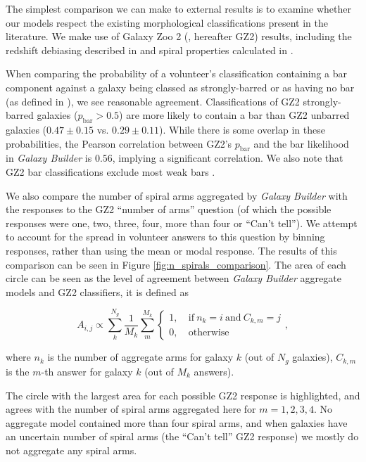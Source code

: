 \documentclass[trackchanges]{aastex63}
\begin{document}
The simplest comparison we can make to external results is to examine whether our models respect the existing morphological classifications present in the literature. We make use of Galaxy Zoo 2 (\citealt{Willett2013:1308.3496v2}, hereafter GZ2) results, including the redshift debiasing described in \citet{Hart2016:1607.01019v1} and spiral properties calculated in \citet{Hart2016:1607.01019v1}.

When comparing the probability of a volunteer's classification containing a bar component against a galaxy being classed as strongly-barred or as having no bar (as defined in \citealt{Masters2010:1003.0449v2}), we see reasonable agreement. Classifications of GZ2 strongly-barred galaxies ($p_\text{bar} > 0.5$) are more likely to contain a bar than GZ2 unbarred galaxies ($0.47 \pm 0.15$ vs. $0.29 \pm 0.11$). While there is some overlap in these probabilities, the Pearson correlation between GZ2's $p_\text{bar}$ and the bar likelihood in \textit{Galaxy Builder} is $0.56$, implying a significant correlation. We also note that GZ2 bar classifications exclude most weak bars \citep{2017MNRAS.469.3363K}.

We also compare the number of spiral arms aggregated by \textit{Galaxy Builder} with the responses to the GZ2 ``number of arms'' question (of which the possible responses were one, two, three, four, more than four or ``Can't tell''). We attempt to account for the spread in volunteer answers to this question by binning responses, rather than using the mean or modal response. The results of this comparison can be seen in Figure \ref{fig:n_spirals_comparison}. The area of each circle can be seen as the level of agreement between \textit{Galaxy Builder} aggregate models and GZ2 classifiers, it is defined as

\begin{equation}
  \label{eq:spiral_circle_area_size}
  A_{i, j} \propto \sum_{k}^{N_g}\frac{1}{M_k}\sum_{m}^{M_k}
  \begin{cases}
    1,&\ \mathrm{if}\ n_k = i\ \mathrm{and}\ C_{k, m} = j\\
    0,&\ \mathrm{otherwise}
  \end{cases},
\end{equation}

where $n_k$ is the number of aggregate arms for galaxy $k$ (out of $N_g$ galaxies), $C_{k, m}$ is the $m$-th answer for galaxy $k$ (out of $M_k$ answers).

The circle with the largest area for each possible GZ2 response is highlighted, and agrees with the number of spiral arms aggregated here for $m=1, 2, 3, 4$. No aggregate model contained more than four spiral arms, and when galaxies have an uncertain number of spiral arms (the ``Can't tell'' GZ2 response) we mostly do not aggregate any spiral arms.
\end{document}
